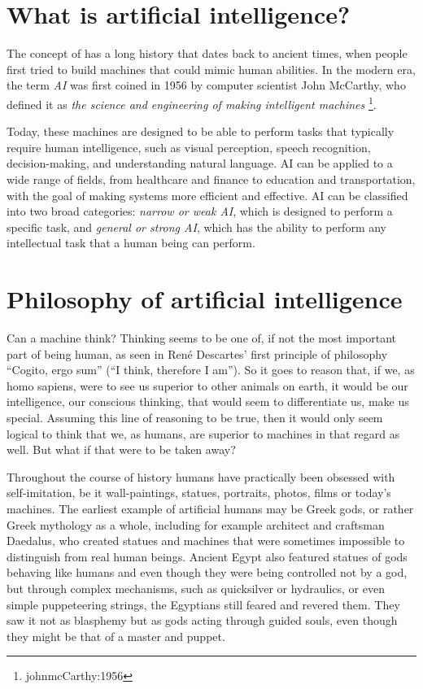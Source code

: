 \section{What is artificial intelligence?}
The concept of  has a long history that dates back to ancient times,
when people first tried to build machines that could mimic human abilities.
In the modern era, the term \textit{AI}  was first coined in 1956 by computer scientist 
John McCarthy, who defined it as \textit{the science and engineering of making 
intelligent machines} \footnote{johnmcCarthy:1956}.

Today, these machines are designed to be able to perform tasks that typically 
require human intelligence, such as visual perception, speech recognition,
decision-making, and understanding natural language. AI can be applied to a wide
range of fields, from healthcare and finance to education and transportation,
with the goal of making systems more efficient and effective.
AI can be classified into two broad categories: \textit{narrow or weak AI},
which is designed to perform a specific task, and \textit{general or strong AI},
 which has the ability to perform any intellectual task that a human being can perform. \cite{KindsOfAI}

\section{Philosophy of artificial intelligence}
Can a machine think? Thinking seems to be one of, if not the most important part of being human, as seen in René Descartes' 
first principle of philosophy “Cogito, ergo sum” (“I think, therefore I am”). So it goes to reason that, if we, as 
homo sapiens, were to see us superior to other animals on earth, it would be our intelligence, our conscious thinking, 
that would seem to differentiate us, make us special. Assuming this line of reasoning to be true, then it would only 
seem logical to think that we, as humans, are superior to machines in that regard as well. But what if that were to be taken away?

Throughout the course of history humans have practically been obsessed with self-imitation, be it wall-paintings, 
statues, portraits, photos, films or today's machines. The earliest example of artificial humans may be Greek gods, 
or rather Greek mythology as a whole, including for example architect and craftsman Daedalus, who created statues and 
machines that were sometimes impossible to distinguish from real human beings. Ancient Egypt also featured statues of 
gods behaving like humans and even though they were being controlled not by a god, but through complex mechanisms, 
such as quicksilver or hydraulics, or even simple puppeteering strings, the Egyptians still feared and revered them. 
They saw it not as blasphemy but as gods acting through guided souls, even though they might be that of a master and puppet.


